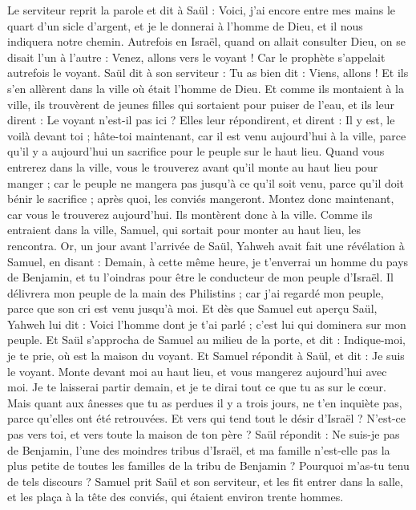 \begin{multicols}{2}
Le serviteur reprit la parole et dit à Saül : Voici, j'ai encore entre mes mains le quart d'un sicle d'argent, et je le donnerai à l'homme de Dieu, et il nous indiquera notre chemin.
Autrefois en Israël, quand on allait consulter Dieu, on se disait l'un à l'autre : Venez, allons vers le voyant ! Car le prophète s'appelait autrefois le voyant.
Saül dit à son serviteur : Tu as bien dit : Viens, allons ! Et ils s'en allèrent dans la ville où était l'homme de Dieu.
Et comme ils montaient à la ville, ils trouvèrent de jeunes filles qui sortaient pour puiser de l'eau, et ils leur dirent : Le voyant n'est-il pas ici ?
Elles leur répondirent, et dirent : Il y est, le voilà devant toi ; hâte-toi maintenant, car il est venu aujourd'hui à la ville, parce qu'il y a aujourd'hui un sacrifice pour le peuple sur le haut lieu.
Quand vous entrerez dans la ville, vous le trouverez avant qu'il monte au haut lieu pour manger ; car le peuple ne mangera pas jusqu'à ce qu'il soit venu, parce qu'il doit bénir le sacrifice ; après quoi, les conviés mangeront. Montez donc maintenant, car vous le trouverez aujourd'hui.
Ils montèrent donc à la ville. Comme ils entraient dans la ville, Samuel, qui sortait pour monter au haut lieu, les rencontra.
Or, un jour avant l’arrivée de Saül, Yahweh avait fait une révélation à Samuel, en disant :
Demain, à cette même heure, je t'enverrai un homme du pays de Benjamin, et tu l'oindras pour être le conducteur de mon peuple d'Israël. Il délivrera mon peuple de la main des Philistins ; car j'ai regardé mon peuple, parce que son cri est venu jusqu'à moi.
Et dès que Samuel eut aperçu Saül, Yahweh lui dit : Voici l'homme dont je t'ai parlé ; c'est lui qui dominera sur mon peuple.
Et Saül s'approcha de Samuel au milieu de la porte, et dit : Indique-moi, je te prie, où est la maison du voyant.
Et Samuel répondit à Saül, et dit : Je suis le voyant. Monte devant moi au haut lieu, et vous mangerez aujourd'hui avec moi. Je te laisserai partir demain, et je te dirai tout ce que tu as sur le cœur.
Mais quant aux ânesses que tu as perdues il y a trois jours, ne t'en inquiète pas, parce qu'elles ont été retrouvées. Et vers qui tend tout le désir d’Israël ? N’est-ce pas vers toi, et vers toute la maison de ton père ?
Saül répondit : Ne suis-je pas de Benjamin, l’une des moindres tribus d'Israël, et ma famille n'est-elle pas la plus petite de toutes les familles de la tribu de Benjamin ? Pourquoi m’as-tu tenu de tels discours ?
Samuel prit Saül et son serviteur, et les fit entrer dans la salle, et les plaça à la tête des conviés, qui étaient environ trente hommes.

\end{multicols}
